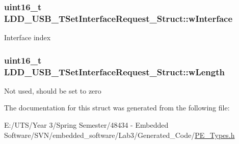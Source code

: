 \subsubsection[{w\+Interface}]{\setlength{\rightskip}{0pt plus 5cm}uint16\+\_\+t L\+D\+D\+\_\+\+U\+S\+B\+\_\+\+T\+Set\+Interface\+Request\+\_\+\+Struct\+::w\+Interface}\label{struct_l_d_d___u_s_b___t_set_interface_request___struct_a6554d6522c7dcbd0e96cbe945b1725de}
Interface index \hypertarget{struct_l_d_d___u_s_b___t_set_interface_request___struct_a7ccdd1f214e5cebbc10cde359ccba50e}{}
\subsubsection[{w\+Length}]{\setlength{\rightskip}{0pt plus 5cm}uint16\+\_\+t L\+D\+D\+\_\+\+U\+S\+B\+\_\+\+T\+Set\+Interface\+Request\+\_\+\+Struct\+::w\+Length}\label{struct_l_d_d___u_s_b___t_set_interface_request___struct_a7ccdd1f214e5cebbc10cde359ccba50e}
Not used, should be set to zero 

The documentation for this struct was generated from the following file\+:\begin{DoxyCompactItemize}
\item 
E\+:/\+U\+T\+S/\+Year 3/\+Spring Semester/48434 -\/ Embedded Software/\+S\+V\+N/embedded\+\_\+software/\+Lab3/\+Generated\+\_\+\+Code/\hyperlink{_p_e___types_8h}{P\+E\+\_\+\+Types.\+h}\end{DoxyCompactItemize}
